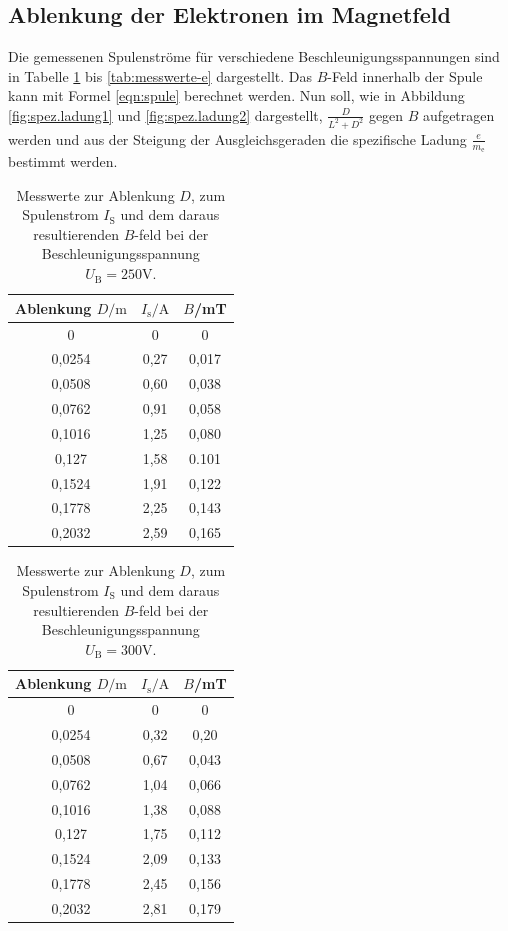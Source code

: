 \subsection{Ablenkung der Elektronen im Magnetfeld}
Die gemessenen Spulenströme für verschiedene Beschleunigungsspannungen sind in Tabelle \ref{tab:messwerte-a} bis \ref{tab:messwerte-e} dargestellt. Das $B$-Feld innerhalb der Spule kann mit Formel \eqref{eqn:spule} berechnet werden. Nun soll, wie in Abbildung \ref{fig:spez.ladung1} und \ref{fig:spez.ladung2} dargestellt, $\frac{D}{L^2+D^2}$ gegen $B$ aufgetragen werden und aus der Steigung der Ausgleichsgeraden die spezifische Ladung $\frac{e}{m_\mathrm{e}}$ bestimmt werden.


\begin{table}
  \caption{Messwerte zur Ablenkung $D$, zum Spulenstrom $I_\mathrm{S}$ und dem daraus resultierenden $B$-feld bei der Beschleunigungsspannung $U_\mathrm{B}=250 \si{\volt}$.}
  \centering
  \label{tab:messwerte-a}
  \begin{tabular}{c c c}
    \toprule
      Ablenkung $D/\si{\meter}$ & $I_\mathrm{s}/\si{\ampere}$ & $B$/\si{\milli\tesla}\\
    \midrule
 0 & 0 & 0\\
0,0254 & 0,27 & 0,017 \\
0,0508 & 0,60  & 0,038\\
0,0762 & 0,91  & 0,058\\
0,1016 & 1,25  & 0,080\\
0,127 & 1,58  & 0.101\\
0,1524 & 1,91 & 0,122\\
0,1778 & 2,25  & 0,143\\
0,2032 & 2,59  & 0,165\\
\bottomrule
\end{tabular}
\end{table}

\begin{table}
  \caption{Messwerte zur Ablenkung $D$, zum Spulenstrom $I_\mathrm{S}$ und dem daraus resultierenden $B$-feld bei der Beschleunigungsspannung $U_\mathrm{B}=300 \si{\volt}$.}
  \centering
  \label{tab:messwerte-b}
  \begin{tabular}{c c c}
    \toprule
      Ablenkung $D/\si{\meter}$ & $I_\mathrm{s}/\si{\ampere}$ & $B$/\si{\milli\tesla}\\
    \midrule
0  & 0 &0\\
0,0254 &0,32 & 0,20 \\
0,0508 & 0,67 & 0,043 \\
0,0762 & 1,04  & 0,066\\
0,1016 & 1,38  & 0,088\\
0,127 & 1,75  & 0,112\\
0,1524 & 2,09  & 0,133\\
0,1778 & 2,45  & 0,156\\
0,2032 & 2,81  & 0,179\\
\bottomrule
\end{tabular}
\end{table}

